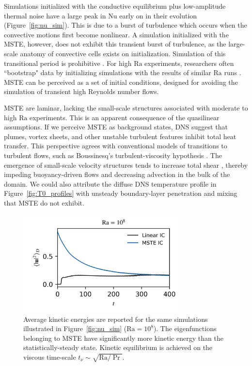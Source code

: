 \documentclass[reprint,amsmath,amssymb,aps]{revtex4-1}
\newcommand\Ra{\mathrm{Ra}}
\newcommand\Nu{\mathrm{Nu}}
\begin{document}
Simulations initialized with the conductive equilibrium plus low-amplitude thermal noise have a large peak in $\Nu$ early on in their evolution (Figure~\ref{fig:nu_sim}).
This is due to a burst of turbulence which occurs when the convective motions first become nonlinear.
A simulation initialized with the MSTE, however, does not exhibit this transient burst of turbulence, as the large-scale anatomy of convective cells exists on initialization. 
Simulation of this transitional period is prohibitive \cite{Anders_AE}. 
For high $\Ra$ experiments, researchers often ``bootstrap" data by initializing simulations with the results of similar $\Ra$ runs \cite{Verzicco, Johnston}. 
MSTE can be perceived as a set of initial conditions, designed for avoiding the simulation of transient high Reynolds number flows.

MSTE are laminar, lacking the small-scale structures associated with moderate to high $\Ra$ experiments. 
This is an apparent consequence of the quasilinear assumptions. 
If we perceive MSTE as background states, DNS suggest that plumes, vortex sheets, and other unstable turbulent features inhibit total heat transfer. 
This perspective agrees with conventional models of transitions to turbulent flows, such as Boussinesq's turbulent-viscosity hypothesis \cite{boussinesq_1877}. The emergence of small-scale velocity structures tends to increase total shear \cite{Lecoanet_KH, drazin_reid_2004, pope_2000}, thereby impeding buoyancy-driven flows and decreasing advection in the bulk of the domain. 
We could also attribute the diffuse DNS temperature profile in Figure~\ref{fig:T0_profiles} with unsteady boundary-layer penetration and mixing that MSTE do not exhibit.

\begin{figure}
    \begin{minipage}{3.4in}
        \centering
        \includegraphics[width=3.4in]{sim_eq_ke.png}
        \caption{Average kinetic energies are reported for the same simulations illustrated in Figure~\ref{fig:nu_sim} ($\Ra = 10^8$). 
        The eigenfunctions belonging to MSTE have significantly more kinetic energy than the statistically-steady state. 
        Kinetic equilibrium is achieved on the viscous time-scale $t_{\nu} \sim \sqrt{\Ra / \Pr}$.}
        \label{fig:ke_sim}
    \end{minipage}
\end{figure}
\end{document}
